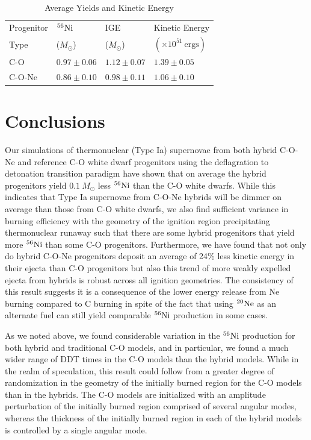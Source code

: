 \documentclass[iop,apj]{emulateapj}
\newcommand{\Ne}[1]{\ensuremath{{}^{#1}{\rm Ne}}}
\newcommand{\Ni}[1]{\ensuremath{{}^{#1}{\rm Ni}}}
\newcommand{\unitstyle}[1]{\ensuremath{\mathrm{#1}}}
\newcommand{\erg}{\unitstyle{ergs}} %
\newcommand{\Msun}{\ensuremath{M_\odot}}
\begin{document}
\begin{table}[htbp]
  \caption{Average Yields and Kinetic Energy}
  \begin{center}
    \begin{tabular}{llll}
      \vspace{-0.75cm} \\ \hline \hline
      Progenitor & \Ni{56} & IGE & Kinetic Energy \\
      Type & (\Msun) & (\Msun) & $\left(\times 10^{51} ~\erg\right)$ \\ \hline
      C-O & $0.97 \pm 0.06$ & $1.12 \pm 0.07$ & $1.39 \pm 0.05$ \\
      C-O-Ne & $0.86 \pm 0.10$ & $0.98 \pm 0.11$ & $1.06 \pm 0.10$ \\ \hline
    \end{tabular}
  \end{center}
  \label{YieldSummaryTable}
\end{table}



\section{Conclusions}
\label{sec:conclusions}
Our simulations of thermonuclear (Type Ia) supernovae from both hybrid
C-O-Ne and reference C-O white dwarf progenitors using the deflagration
to detonation transition paradigm have shown that on average the
hybrid progenitors yield $0.1~\Msun$ less \Ni{56} than the C-O white
dwarfs. While this indicates that Type Ia supernovae from C-O-Ne
hybrids will be dimmer on average than those from C-O white dwarfs, we
also find sufficient variance in burning efficiency with the geometry
of the ignition region precipitating thermonuclear runaway such that
there are some hybrid progenitors that yield more \Ni{56} than some
C-O progenitors. Furthermore, we have found that not only do hybrid
C-O-Ne progenitors deposit an average of 24\% less kinetic energy in
their ejecta than C-O progenitors but also this trend of more weakly
expelled ejecta from hybrids is robust across all ignition geometries.
The consistency of this result suggests it is a consequence of the
lower energy release from Ne burning compared to C burning in spite of
the fact that using \Ne{20} as an alternate fuel can still yield
comparable \Ni{56} production in some cases.

As we noted above, we found considerable variation in the \Ni{56}
production for both hybrid and traditional C-O models, and in
particular, we found a much wider range of DDT times in the C-O models
than the hybrid models. While in the realm of speculation, this result
could follow from a greater degree of randomization in the geometry of
the initially burned region for the C-O models than in the hybrids. The
C-O models are initialized with an amplitude perturbation of the
initially burned region comprised of several angular modes, whereas the
thickness of the initially burned region in each of the hybrid models
is controlled by a single angular mode.
\end{document}
